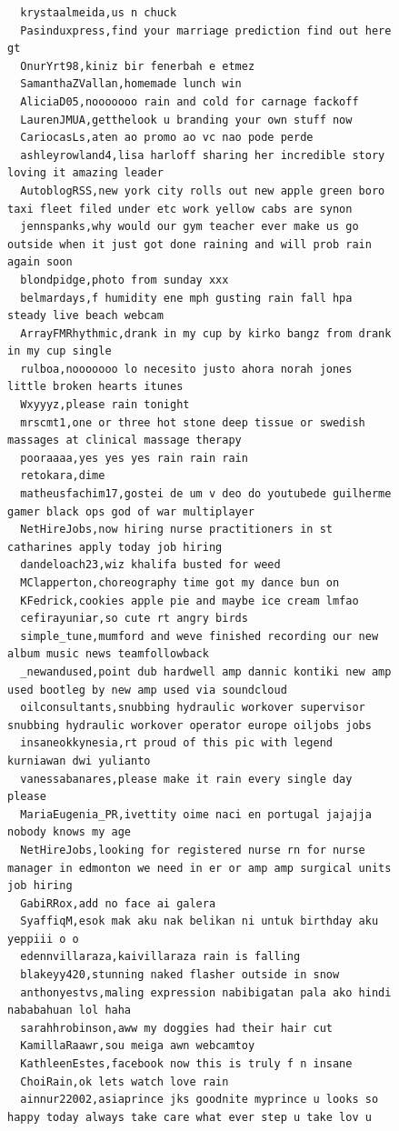 \begin{figure}[htpb]
\begin{verbatim}
  krystaalmeida,us n chuck
  Pasinduxpress,find your marriage prediction find out here gt
  OnurYrt98,kiniz bir fenerbah e etmez
  SamanthaZVallan,homemade lunch win
  AliciaD05,nooooooo rain and cold for carnage fackoff
  LaurenJMUA,getthelook u branding your own stuff now
  CariocasLs,aten ao promo ao vc nao pode perde
  ashleyrowland4,lisa harloff sharing her incredible story loving it amazing leader
  AutoblogRSS,new york city rolls out new apple green boro taxi fleet filed under etc work yellow cabs are synon
  jennspanks,why would our gym teacher ever make us go outside when it just got done raining and will prob rain again soon
  blondpidge,photo from sunday xxx
  belmardays,f humidity ene mph gusting rain fall hpa steady live beach webcam
  ArrayFMRhythmic,drank in my cup by kirko bangz from drank in my cup single
  rulboa,nooooooo lo necesito justo ahora norah jones little broken hearts itunes
  Wxyyyz,please rain tonight
  mrscmt1,one or three hot stone deep tissue or swedish massages at clinical massage therapy
  pooraaaa,yes yes yes rain rain rain
  retokara,dime
  matheusfachim17,gostei de um v deo do youtubede guilherme gamer black ops god of war multiplayer
  NetHireJobs,now hiring nurse practitioners in st catharines apply today job hiring
  dandeloach23,wiz khalifa busted for weed
  MClapperton,choreography time got my dance bun on
  KFedrick,cookies apple pie and maybe ice cream lmfao
  cefirayuniar,so cute rt angry birds
  simple_tune,mumford and weve finished recording our new album music news teamfollowback
  _newandused,point dub hardwell amp dannic kontiki new amp used bootleg by new amp used via soundcloud
  oilconsultants,snubbing hydraulic workover supervisor snubbing hydraulic workover operator europe oiljobs jobs
  insaneokkynesia,rt proud of this pic with legend kurniawan dwi yulianto
  vanessabanares,please make it rain every single day please
  MariaEugenia_PR,ivettity oime naci en portugal jajajja nobody knows my age
  NetHireJobs,looking for registered nurse rn for nurse manager in edmonton we need in er or amp amp surgical units job hiring
  GabiRRox,add no face ai galera
  SyaffiqM,esok mak aku nak belikan ni untuk birthday aku yeppiii o o
  edennvillaraza,kaivillaraza rain is falling
  blakeyy420,stunning naked flasher outside in snow
  anthonyestvs,maling expression nabibigatan pala ako hindi nababahuan lol haha
  sarahhrobinson,aww my doggies had their hair cut
  KamillaRaawr,sou meiga awn webcamtoy
  KathleenEstes,facebook now this is truly f n insane
  ChoiRain,ok lets watch love rain
  ainnur22002,asiaprince jks goodnite myprince u looks so happy today always take care what ever step u take lov u

\end{verbatim}
\end{figure}

